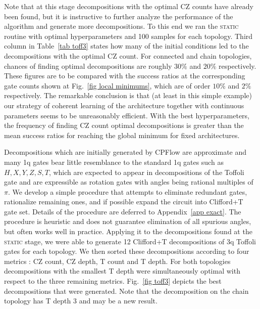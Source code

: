\documentclass[draft, twocolumn, amsfonts, amssymb, aps, nofootinbib]{revtex4-2}
\newcommand{\CZ}{\textsf{CZ }}
\newcommand{\T}{\textsf{T }}
\newcommand{\package}[1]{\textrm {#1 }}
\newcommand{\cpflow}{\package{CPFlow}}
\newcommand{\static}{\textsc{static }}
\begin{document}
Note that at this stage decompositions with the optimal \CZ counts have already been found, but it is instructive to further analyze the performance of the algorithm and generate more decompositions. To this end we ran the \static routine with optimal hyperparameters and 100 samples for each topology. Third column in Table~\ref{tab toff3} states how many of the initial conditions led to the decompositions with the optimal \CZ count. For connected and chain topologies, chances of finding optimal decompositions are roughly $30\%$ and $20\%$ respectively. These figures are to be compared with the success ratios at the corresponding gate counts shown at Fig.~\ref{fig local minimums}, which are of order $10\%$ and $2\%$ respectively. The remarkable conclusion is that (at least in this simple example) our strategy of coherent learning of the architecture together with continuous parameters seems to be unreasonably efficient. With the best hyperparameters, the frequency of finding \CZ count optimal decompositions is greater than the mean success ratios for reaching the global minimum for fixed architectures.

Decompositions which are initially generated by \cpflow are approximate and many 1q gates bear little resemblance to the standard 1q gates such as $H, X, Y, Z, S, T$, which are expected to appear in decompositions of the Toffoli gate and are expressible as rotation gates with angles being rational multiples of $\pi$. We develop a simple procedure that attempts to eliminate redundant gates, rationalize remaining ones, and if possible expand the circuit into Clifford+T gate set. Details of the procedure are deferred to Appendix~\ref{app exact}. The procedure is heuristic and does not guarantee elimination of all spurious angles, but often works well in practice. Applying it to the decompositions found at the \static stage, we were able to generate 12 Clifford+T decompositions of 3q Toffoli gates for each topology. We then sorted these decompositions according to four metrics : \CZ count, \CZ depth, \T count and \T depth. For both topologies decompositions with the smallest \T  depth were simultaneously optimal with respect to the three remaining metrics. Fig.~\ref{fig toff3} depicts the best decompositions that were generated. Note that the decomposition on the chain topology has \T depth 3 and may be a new result.
\end{document}
